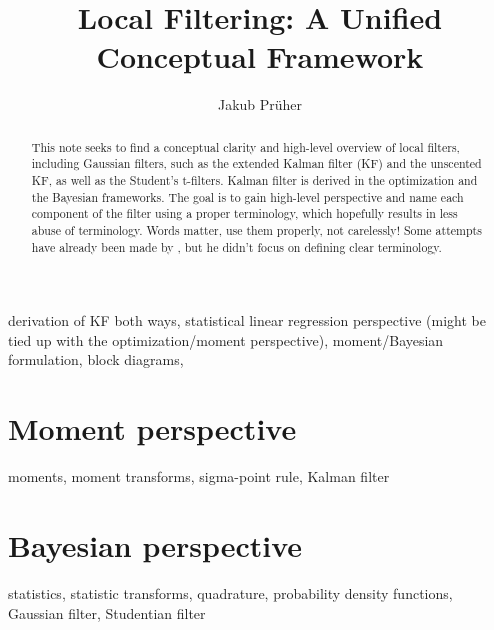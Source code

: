 \documentclass[a4paper,10pt]{scrreprt}
\title{Local Filtering: A Unified Conceptual Framework}
\author{Jakub Prüher}
\theoremstyle{theorem}
\theoremstyle{definition}
\begin{document}
\maketitle

\begin{abstract}
	This note seeks to find a conceptual clarity and high-level overview of local filters, including Gaussian filters, such as the extended Kalman filter (KF) and the unscented KF, as well as the Student's t-filters.
	Kalman filter is derived in the optimization and the Bayesian frameworks.
	The goal is to gain high-level perspective and name each component of the filter using a proper terminology, which hopefully results in less abuse of terminology.
	Words matter, use them properly, not carelessly!
	Some attempts have already been made by \cite{Deisenroth2011}, but he didn't focus on defining clear terminology.
\end{abstract}


derivation of KF both ways, statistical linear regression perspective (might be tied up with the optimization/moment perspective), moment/Bayesian formulation, block diagrams,

\section{Moment perspective}
moments, moment transforms, sigma-point rule, Kalman filter

\section{Bayesian perspective}
statistics, statistic transforms, quadrature, probability density functions, Gaussian filter, Studentian filter







\end{document}
